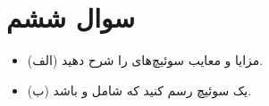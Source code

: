 \section{سوال ششم}

\begin{itemize}
	\item (الف) مزایا و معایب سوئیچ‌های  را شرح دهید.
	\item (ب) یک سوئیچ  رسم کنید که شامل  و  باشد.
\end{itemize}